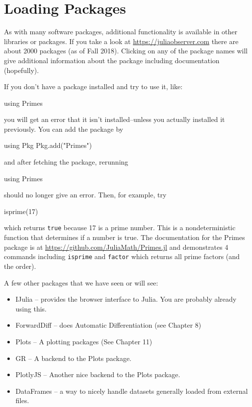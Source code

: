 %
\hypertarget{ch:packages}{%
\chapter{Loading Packages}\label{ch:packages}}


As with many software packages, additional functionality is available in
other libraries or packages. If you take a look at
\href{Julia's\%20Package\%20Listing}{https://juliaobserver.com} there
are about 2000 packages (as of Fall 2018). Clicking on any of the
package names will give additional information about the package
including documentation (hopefully).

If you don't have a package installed and try to use it, like:

\begin{jlverbatim}
using Primes
\end{jlverbatim}
%
you will get an error that it isn't installed--unless you actually installed it previously. You can add the package by

\begin{jlverbatim}
using Pkg
Pkg.add("Primes")
\end{jlverbatim}

and after fetching the package, rerunning
%
\begin{jlblock}
using Primes
\end{jlblock}
%
should no longer give an error. Then, for example, try
%
\begin{jlblock}
isprime(17)
\end{jlblock}
%
which returns \verb!true! because 17 is a prime number. This is a
nondeterministic function that determines if a number is true. The
documentation for the Primes package is at
\url{https://github.com/JuliaMath/Primes.jl} and demonstrates 4 commands
including \texttt{isprime} and \texttt{factor} which returns all prime
factors (and the order).

A few other packages that we have seen or will see:

\begin{itemize}

\item
  IJulia -- provides the browser interface to Julia. You are probably
  already using this.
\item
  ForwardDiff -- does Automatic Differentiation (see Chapter 8)
\item
  Plots -- A plotting packages (See Chapter 11)
\item
  GR -- A backend to the Plots package.
\item
  PlotlyJS -- Another nice backend to the Plots package.
\item
  DataFrames -- a way to nicely handle datasets generally loaded from
  external files.
\end{itemize}

